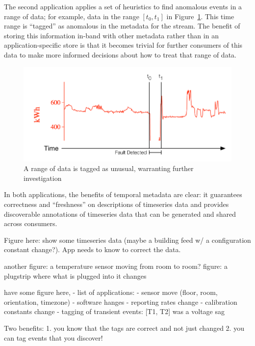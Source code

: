 
The second application applies a set of heuristics to find anomalous events in a range of data; for example, data
in the range $[t_0, t_1]$ in Figure~\ref{fig:faultdetected}. This time range is ``tagged'' as anomalous in the metadata
for the stream. The benefit of storing this information in-band with other metadata rather than in an application-specific
store is that it becomes trivial for further consumers of this data to make more informed decisions about how to treat
that range of data.

\begin{figure}
\centering
\includegraphics[width=.9\linewidth]{figs/faultdetected.pdf}
\caption{A range of data is tagged as unusual, warranting further investigation}
\label{fig:faultdetected}
\end{figure}

In both applications, the benefits of temporal metadata are clear: it guarantees
correctness and ``freshness'' on descriptions of timeseries data and provides
discoverable annotations of timeseries data that can be generated and shared across
consumers.

Figure here: show some timeseries data (maybe a building feed w/ a configuration
constant change?). App needs to know to correct the data.

another figure: a temperature sensor moving from room to room?
figure: a plugstrip where what is plugged into it changes
\fi

have some figure here,
- list of applications:
    - sensor move (floor, room, orientation, timezone)
    - software hanges
    - reporting rates change
    - calibration constants change
    - tagging of transient events: [T1, T2] was a voltage sag

Two benefits:
1. you know that the tags are correct and not just changed
2. you can tag events that you discover!
\fi

